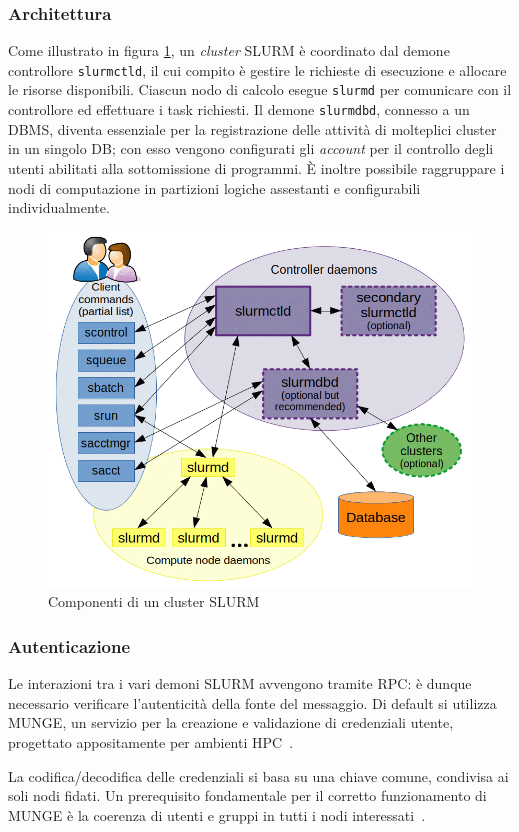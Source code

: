 \documentclass[12pt,a4paper,twoside,openright]{book}
\begin{document}
\subsubsection{Architettura}
Come illustrato in figura \ref{fig:slurm-architecture}, un \textit{cluster} \ac{SLURM} è coordinato dal demone controllore \texttt{slurmctld}, il cui compito è gestire le richieste di esecuzione e allocare le risorse disponibili. Ciascun nodo di calcolo esegue \texttt{slurmd} per comunicare con il controllore ed effettuare i task richiesti. Il demone \texttt{slurmdbd}, connesso a un \ac{DBMS}, diventa essenziale per la registrazione delle attività di molteplici cluster in un singolo \ac{DB}; con esso vengono configurati gli \textit{account} per il controllo degli utenti abilitati alla sottomissione di programmi. È inoltre possibile raggruppare i nodi di computazione in partizioni logiche assestanti e configurabili individualmente.
\begin{figure}[ht]
    \centering
    \includegraphics[width=0.65\linewidth]{images/slurm_architecture.png}
    \caption{Componenti di un cluster \ac{SLURM}~\cite{slurmoverview}}
    \label{fig:slurm-architecture}
\end{figure}

\subsubsection{Autenticazione}
Le interazioni tra i vari demoni \ac{SLURM} avvengono tramite \acf{RPC}: è dunque necessario verificare l'autenticità della fonte del messaggio. Di default si utilizza \acf{MUNGE}, un servizio per la creazione e validazione di credenziali utente, progettato appositamente per ambienti \ac{HPC}~\cite{slurmauth}.

La codifica/decodifica delle credenziali si basa su una chiave comune, condivisa ai soli nodi fidati. Un prerequisito fondamentale per il corretto funzionamento di \ac{MUNGE} è la coerenza di utenti e gruppi in tutti i nodi interessati~\cite{mungedoc}.
\end{document}
